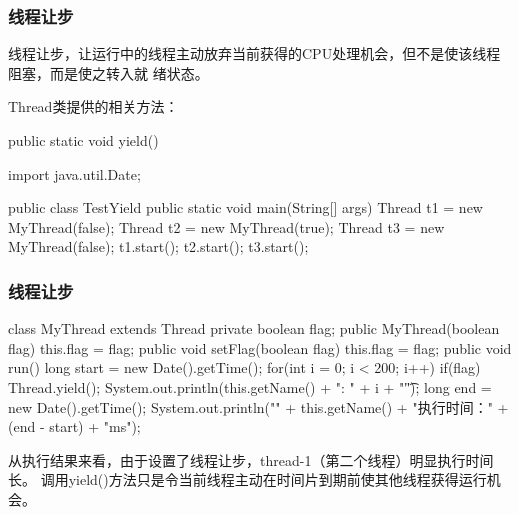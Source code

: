 \begin{frame}[fragile] %
\frametitle{线程让步}

线程让步，让运行中的线程主动放弃当前获得的CPU处理机会，但不是使该线程阻塞，而是使之转入就
绪状态。

Thread类提供的相关方法：
\begin{javaCode}
public static void yield()  
\end{javaCode}
\begin{javaCode}
import java.util.Date;

public class TestYield {
  public static void main(String[] args) {
    Thread t1 = new MyThread(false);
    Thread t2 = new MyThread(true);
    Thread t3 = new MyThread(false);
    t1.start();
    t2.start();
    t3.start();
  }
}
\end{javaCode}
\end{frame}

\begin{frame}[fragile] %
\frametitle{线程让步}

\begin{javaCode}
class MyThread extends Thread {
  private boolean flag;
  public MyThread(boolean flag) {
    this.flag = flag;
  }
  public void setFlag(boolean flag) {
    this.flag = flag;
  }
  public void run() {
    long start = new Date().getTime();
    for(int i = 0; i < 200; i++) {
      if(flag) {
        Thread.yield();
      }
      System.out.println(this.getName() + ": " + i + "\t");
    }
    long end = new Date().getTime();
    System.out.println("\n" + this.getName() + "执行时间：" + (end - start) + "ms");
  }
}
\end{javaCode}

从执行结果来看，由于设置了线程让步，thread-1（第二个线程）明显执行时间长。
调用yield()方法只是令当前线程主动在时间片到期前使其他线程获得运行机会。
\end{frame}

